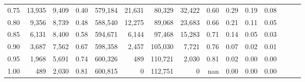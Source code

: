 \begin{tabular}{rrrrrrrrrrrrrrr}
0.75 &  13,935 &   9,409 &  0.40 &  579,184 &   21,631 &   80,329 &   32,422 &  0.60 &  0.29 &  0.19 &      0.08 \\
0.80 &   9,356 &   8,739 &  0.48 &  588,540 &   12,275 &   89,068 &   23,683 &  0.66 &  0.21 &  0.11 &      0.05 \\
0.85 &   6,131 &   8,400 &  0.58 &  594,671 &    6,144 &   97,468 &   15,283 &  0.71 &  0.14 &  0.05 &      0.03 \\
0.90 &   3,687 &   7,562 &  0.67 &  598,358 &    2,457 &  105,030 &    7,721 &  0.76 &  0.07 &  0.02 &      0.01 \\
0.95 &   1,968 &   5,691 &  0.74 &  600,326 &      489 &  110,721 &    2,030 &  0.81 &  0.02 &  0.00 &      0.00 \\
1.00 &     489 &   2,030 &  0.81 &  600,815 &        0 &  112,751 &        0 &   nan &  0.00 &  0.00 &      0.00 \\
\bottomrule
\end{tabular}
